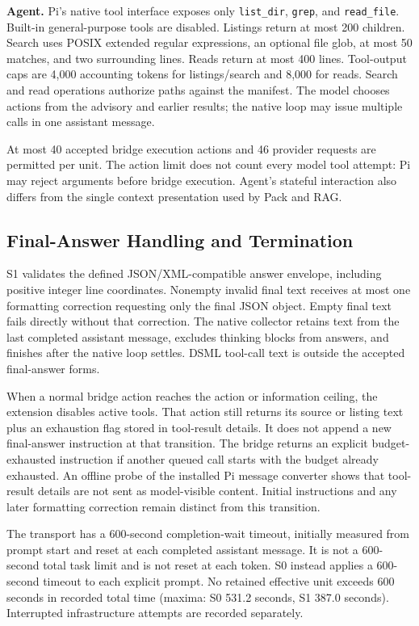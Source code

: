 \textbf{Agent.} Pi's native tool interface exposes only \texttt{list\_dir}, \texttt{grep}, and \texttt{read\_file}. Built-in general-purpose tools are disabled. Listings return at most 200 children. Search uses POSIX extended regular expressions, an optional file glob, at most 50 matches, and two surrounding lines. Reads return at most 400 lines. Tool-output caps are 4,000 accounting tokens for listings/search and 8,000 for reads. Search and read operations authorize paths against the manifest. The model chooses actions from the advisory and earlier results; the native loop may issue multiple calls in one assistant message.

At most 40 accepted bridge execution actions and 46 provider requests are permitted per unit. The action limit does not count every model tool attempt: Pi may reject arguments before bridge execution. Agent's stateful interaction also differs from the single context presentation used by Pack and RAG.

\subsection{Final-Answer Handling and Termination}
S1 validates the defined JSON/XML-compatible answer envelope, including positive integer line coordinates. Nonempty invalid final text receives at most one formatting correction requesting only the final JSON object. Empty final text fails directly without that correction. The native collector retains text from the last completed assistant message, excludes thinking blocks from answers, and finishes after the native loop settles. DSML tool-call text is outside the accepted final-answer forms.

When a normal bridge action reaches the action or information ceiling, the extension disables active tools. That action still returns its source or listing text plus an exhaustion flag stored in tool-result details. It does not append a new final-answer instruction at that transition. The bridge returns an explicit budget-exhausted instruction if another queued call starts with the budget already exhausted. An offline probe of the installed Pi message converter shows that tool-result details are not sent as model-visible content. Initial instructions and any later formatting correction remain distinct from this transition.

The transport has a 600-second completion-wait timeout, initially measured from prompt start and reset at each completed assistant message. It is not a 600-second total task limit and is not reset at each token. S0 instead applies a 600-second timeout to each explicit prompt. No retained effective unit exceeds 600 seconds in recorded total time (maxima: S0 531.2 seconds, S1 387.0 seconds). Interrupted infrastructure attempts are recorded separately.

